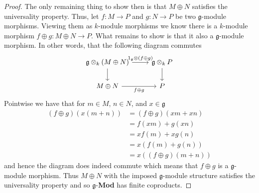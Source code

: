 \begin{proof}
  The only remaining thing to show then is that $ M \oplus N $ satisfies the universality property. Thus, let $ f: M \to P $ and $ g: N \to P $ be two $ \mathfrak{g} $-module morphisms. Viewing them as $ k $-module morphisms we know there is a $ k $-module morphism $ f \oplus g: M \oplus N \to P $. What remains to show is that it also a $ \mathfrak{g} $-module morphism. In other words, that the following diagram commutes
  \[\begin{tikzcd}
	  {\mathfrak{g} \otimes_k (M \oplus N)} & {\mathfrak{g} \otimes_k P} \\
	  {M\oplus N} & P
	  \arrow[from=1-1, to=2-1]
	  \arrow["{f\oplus g}"', from=2-1, to=2-2]
	  \arrow[from=1-2, to=2-2]
	  \arrow["{1_\mathfrak{g} \otimes (f \oplus g)}", from=1-1, to=1-2]
  \end{tikzcd}\]
  Pointwise we have that for $ m \in M $, $ n \in N $, and $ x \in \mathfrak{g} $
  \begin{align*}
    (f \oplus g) (x(m+n)) &= (f \oplus g)(xm + xn) \\
                          &= f(xm) + g(xn) \\
                          &= xf(m) + xg(n) \\
                          &= x(f(m) + g(n)) \\
                          &= x((f \oplus g)(m + n))
  \end{align*}
  and hence the diagram does indeed commute which means that $ f \oplus g $ is a $ \mathfrak{g} $-module morphism. Thus $ M \oplus N $ with the imposed $ \mathfrak{g} $-module structure satisfies the universality property and so $ \mathfrak{g} $-\textbf{Mod} has finite coproducts.
\end{proof}

